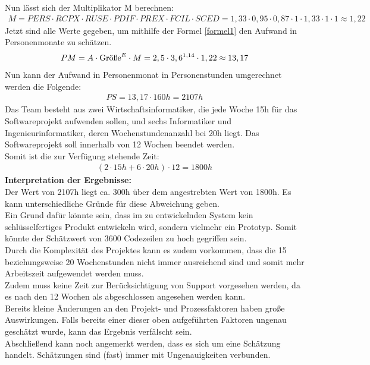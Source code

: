 \documentclass[../review_1.tex]{subfiles}
\begin{document}
Nun lässt sich der Multiplikator M berechnen:
\begin{align*}
    M = PERS \cdot RCPX \cdot RUSE \cdot PDIF \cdot PREX \cdot FCIL \cdot SCED = 1,33 \cdot 0,95 \cdot 0,87 \cdot1 \cdot 1,33 \cdot 1 \cdot 1 \approx 1,22
\end{align*}
Jetzt sind alle Werte gegeben, um mithilfe der Formel \ref{formel1} den Aufwand in Personenmonate zu schätzen.
\begin{align*}
    PM = A \cdot \text{Größe}^E \cdot M = 2,5 \cdot 3,6 \textsuperscript{1,14} \cdot1,22 \approx 13,17
\end{align*}
Nun kann der Aufwand in Personenmonat in Personenstunden umgerechnet werden die Folgende:
\begin{align*}
    PS= 13,17 \cdot 160h = 2107h
\end{align*}
Das Team besteht aus zwei Wirtschaftsinformatiker, die jede Woche 15h für das Softwareprojekt aufwenden sollen, und sechs Informatiker und Ingenieurinformatiker, deren Wochenstundenanzahl bei 20h liegt. Das Softwareprojekt soll innerhalb von 12 Wochen beendet werden.\\
Somit ist die zur Verfügung stehende Zeit:
\begin{align*}
    (2\cdot15 h+6\cdot20 h)\cdot12=1800h
\end{align*}
\textbf{Interpretation der Ergebnisse:}\\ \newline
Der Wert von 2107h liegt ca. 300h über dem angestrebten Wert von 1800h. Es kann unterschiedliche Gründe für diese Abweichung geben.\\
Ein Grund dafür könnte sein, dass im zu entwickelnden System kein schlüsselfertiges Produkt entwickeln wird, sondern vielmehr ein Prototyp. Somit könnte der Schätzwert von 3600 Codezeilen zu hoch gegriffen sein.\\
Durch die Komplexität des Projektes kann es zudem vorkommen, dass die 15 beziehungsweise 20 Wochenstunden nicht immer ausreichend sind und somit mehr Arbeitszeit aufgewendet werden muss.\\
Zudem muss keine Zeit zur Berücksichtigung von Support vorgesehen werden, da es nach den 12 Wochen als abgeschlossen angesehen werden kann.\\
Bereits kleine Änderungen an den Projekt- und Prozessfaktoren haben große Auswirkungen. Falls bereits einer dieser oben aufgeführten Faktoren ungenau geschätzt wurde, kann das Ergebnis verfälscht sein.\\
Abschließend kann noch angemerkt werden, dass es sich um eine Schätzung handelt. Schätzungen sind (fast) immer mit Ungenauigkeiten verbunden.
\end{document}
